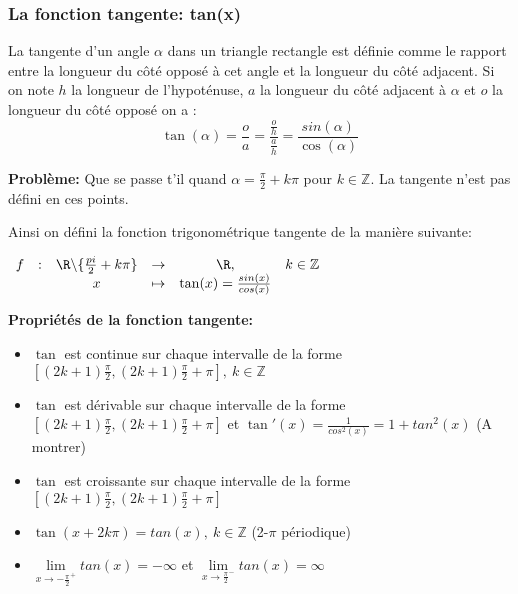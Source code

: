 \subsubsection{La fonction tangente: tan(x)}
La tangente d'un angle $\alpha$ dans un triangle rectangle est définie comme
le rapport entre la longueur du côté opposé à cet angle et la
longueur du côté adjacent. Si on note $h$ la longueur de l'hypoténuse,
$a$ la longueur du côté adjacent à $\alpha$ et $o$ la longueur du côté
opposé on a :
\[
  \tan(\alpha) = \frac{o}{a} = \frac{\frac{o}{h}}{\frac{a}{h}} =
  \frac{sin(\alpha)}{\cos(\alpha)}
\]

\textbf{Problème: } Que se passe t'il quand $\alpha = \frac{\pi}{2} +
k\pi$ pour $k \in \mathbb{Z}$. La tangente n'est pas défini en ces
points.

Ainsi on défini la fonction trigonométrique tangente de la manière
suivante:

\begin{center}
  $\begin{array}{cccccc}
     f & : & \R \backslash \{ \frac{pi}{2} + k \pi \} & \to & \R, &
       k \in \mathbb{Z}\\
       & & x & \mapsto & \tan(x)=\frac{sin(x)}{cos(x)} \\
   \end{array}$
 \end{center}

\textbf{Propriétés de la fonction tangente: }
\begin{itemize}[label=$\bullet$, leftmargin=2cm]
\item $\tan$ est continue sur chaque intervalle de la forme
  $[(2k+1)\frac{\pi}{2}, (2k+1)\frac{\pi}{2} + \pi],~ k \in \mathbb{Z}$
\item $\tan$ est dérivable sur chaque intervalle de la forme
  $[(2k+1)\frac{\pi}{2}, (2k+1)\frac{\pi}{2} + \pi]$ et $\tan'(x)
  =\frac{1}{cos^2(x)} = 1+tan^2(x)$ (A montrer)
\item $\tan$ est croissante sur chaque intervalle de la forme
  $[(2k+1)\frac{\pi}{2}, (2k+1)\frac{\pi}{2} + \pi]$ 
\item $\tan(x+2k\pi) = tan(x),~ k \in \mathbb{Z}$ (2-$\pi$
  périodique)
\item $\lim \limits_{x \to -\frac{\pi}{2}^+} tan(x) = -\infty$ et $\lim
  \limits_{x \to \frac{\pi}{2}^-} tan(x) = \infty$ 
\end{itemize}

\vspace{1\baselineskip}

